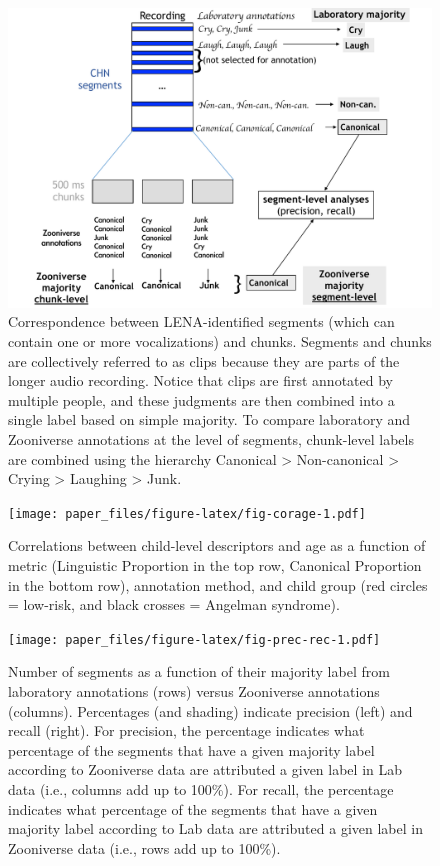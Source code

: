 \documentclass[english,,man]{apa6}
\begin{document}
\begin{figure}
\centering
\includegraphics{fig_levels.key.pdf}
\caption{\label{fig:fig-process}Correspondence between LENA-identified segments (which can contain one or more vocalizations) and chunks. Segments and chunks are collectively referred to as clips because they are parts of the longer audio recording. Notice that clips are first annotated by multiple people, and these judgments are then combined into a single label based on simple majority. To compare laboratory and Zooniverse annotations at the level of segments, chunk-level labels are combined using the hierarchy Canonical \textgreater{} Non-canonical \textgreater{} Crying \textgreater{} Laughing \textgreater{} Junk.}
\end{figure}

\begin{figure}
\centering
\texttt{[image: paper\_files/figure-latex/fig-corage-1.pdf]}
\caption{\label{fig:fig-corage}Correlations between child-level descriptors and age as a function of metric (Linguistic Proportion in the top row, Canonical Proportion in the bottom row), annotation method, and child group (red circles = low-risk, and black crosses = Angelman syndrome).}
\end{figure}

\begin{figure}
\centering
\texttt{[image: paper\_files/figure-latex/fig-prec-rec-1.pdf]}
\caption{\label{fig:fig-prec-rec}Number of segments as a function of their majority label from laboratory annotations (rows) versus Zooniverse annotations (columns). Percentages (and shading) indicate precision (left) and recall (right). For precision, the percentage indicates what percentage of the segments that have a given majority label according to Zooniverse data are attributed a given label in Lab data (i.e., columns add up to 100\%). For recall, the percentage indicates what percentage of the segments that have a given majority label according to Lab data are attributed a given label in Zooniverse data (i.e., rows add up to 100\%).}
\end{figure}
\end{document}
